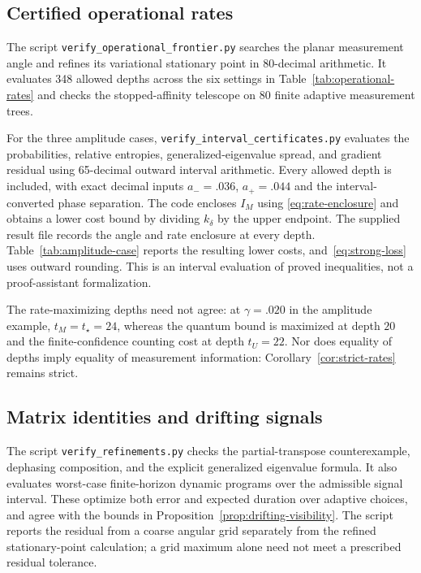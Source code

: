 \documentclass[11pt,a4paper]{article}
\theoremstyle{definition}
\theoremstyle{remark}
\numberwithin{equation}{section}
\begin{document}
\subsection{Certified operational rates}
The script \texttt{verify\_operational\_frontier.py} searches the planar
measurement angle and refines its variational stationary point in
80-decimal arithmetic. It evaluates 348 allowed depths across the six
settings in Table~\ref{tab:operational-rates} and checks the
stopped-affinity telescope on 80 finite adaptive measurement trees.


For the three amplitude cases,
\texttt{verify\_interval\_certificates.py} evaluates the probabilities,
relative entropies, generalized-eigenvalue spread, and gradient residual
using 65-decimal outward interval arithmetic. Every allowed depth is
included, with exact decimal inputs $a_-=.036$, $a_+=.044$ and the
interval-converted phase separation. The code encloses $I_M$ using
\eqref{eq:rate-enclosure} and obtains a lower cost bound by dividing
$k_\delta$ by the upper endpoint. The supplied result file records the
angle and rate enclosure at every depth. Table~\ref{tab:amplitude-case}
reports the resulting lower costs, and~\eqref{eq:strong-loss} uses
outward rounding. This is an interval evaluation of proved inequalities,
not a proof-assistant formalization.

The rate-maximizing depths need not agree: at $\gamma=.020$ in the
amplitude example, $t_M=t_\star=24$, whereas the quantum bound is
maximized at depth $20$ and the finite-confidence counting cost at depth
$t_U=22$. Nor does equality of depths imply equality of measurement
information: Corollary~\ref{cor:strict-rates} remains strict.

\subsection{Matrix identities and drifting signals}
The script \texttt{verify\_refinements.py} checks the partial-transpose
counterexample, dephasing composition, and the explicit generalized
eigenvalue formula. It also evaluates worst-case finite-horizon dynamic
programs over the admissible signal interval. These optimize both error
and expected duration over adaptive choices, and agree with the bounds
in Proposition~\ref{prop:drifting-visibility}. The script reports the
residual from a coarse angular grid separately from the refined
stationary-point calculation; a grid maximum alone need not meet a
prescribed residual tolerance.
\end{document}
